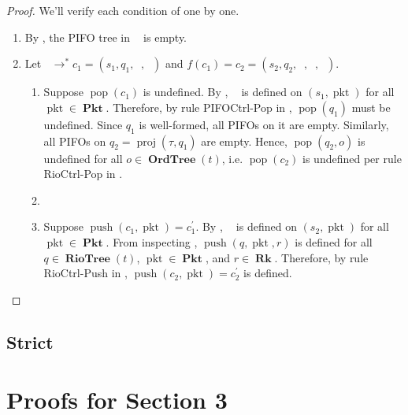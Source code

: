 \documentclass{amsart}
\DeclareMathOperator{\pkt}{\mathrm{pkt}}
\DeclareMathOperator{\push}{\mathrm{push}}
\DeclareMathOperator{\pop}{\mathrm{pop}}
\DeclareMathOperator{\proj}{\mathrm{proj}}
\DeclareMathOperator{\Pkt}{\mathbf{Pkt}}
\DeclareMathOperator{\Rk}{\mathbf{Rk}}
\DeclareMathOperator{\RioTree}{\mathbf{RioTree}}
\DeclareMathOperator{\OrdTree}{\mathbf{OrdTree}}
\DeclareMathOperator{\zprepush}{z_{\mathrm{pre-push}}}
\DeclareMathOperator{\zprepop}{z_{\mathrm{pre-pop}}}
\DeclareMathOperator{\zpostpop}{z_{\mathrm{post-pop}}}
\DeclareMathOperator{\tzprepush}{z^{\prime}_{\mathrm{pre-push}}}
\DeclareMathOperator{\crr}{c_{\text{RR}}}
\theoremstyle{definition}
\begin{document}
\begin{proof}
    We'll verify each condition of  one by one.
    \begin{enumerate}
        \item By , the PIFO tree in $\crr$ is empty.
        \item Let $\crr \to^\ast c_1 = (s_1, q_1, \zprepush, \zprepop)$ and $f(c_1) = c_2 = (s_2, q_2, \zprepush, \zprepop, \zpostpop)$.
            \begin{enumerate}
                \item Suppose $\pop(c_1)$ is undefined.
                    By , $\zpostpop$ is defined on $(s_1, \pkt)$ for all $\pkt \in \Pkt$.
                    Therefore, by rule PIFOCtrl-Pop in , $\pop(q_1)$ must be undefined.
                    Since $q_1$ is well-formed, all PIFOs on it are empty.
                    Similarly, all PIFOs on $q_2 = \proj(\tau, q_1)$ are empty.
                    Hence, $\pop(q_2, o)$ is undefined for all $o \in \OrdTree(t)$, i.e. $\pop(c_2)$ is undefined per rule RioCtrl-Pop in .

                \item

                \item Suppose $\push(c_1, \pkt) = c_1^\prime$.
                    By , $\tzprepush$ is defined on $(s_2, \pkt)$ for all $\pkt \in \Pkt$.
                    From inspecting , $\push(q, \pkt, r)$ is defined for all $q \in \RioTree(t)$, $\pkt \in \Pkt$, and $r \in \Rk$.
                    Therefore, by rule RioCtrl-Push in , $\push(c_2, \pkt) = c_2^\prime$ is defined.
            \end{enumerate}
    \end{enumerate}
\end{proof}


\newpage

\subsection{Strict}

\newpage

\renewcommand\refname{\LARGE References}



\newpage

\appendix

\section{Proofs for Section 3} \label{sec:details}
\end{document}
